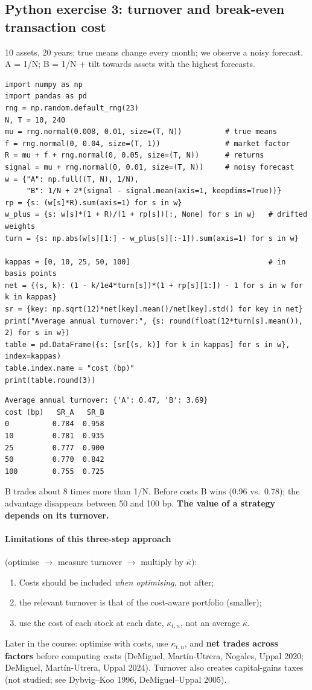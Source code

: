 \documentclass[11pt,a4paper]{report}
\begin{document}
\subsection*{Python exercise 3: turnover and break-even transaction cost}
10 assets, 20 years; true means change every month; we observe a noisy forecast.
A = 1/N; B = 1/N + tilt towards assets with the highest forecasts.
\begin{lstlisting}
import numpy as np
import pandas as pd
rng = np.random.default_rng(23)
N, T = 10, 240
mu = rng.normal(0.008, 0.01, size=(T, N))          # true means
f = rng.normal(0, 0.04, size=(T, 1))               # market factor
R = mu + f + rng.normal(0, 0.05, size=(T, N))      # returns
signal = mu + rng.normal(0, 0.01, size=(T, N))     # noisy forecast
w = {"A": np.full((T, N), 1/N),
     "B": 1/N + 2*(signal - signal.mean(axis=1, keepdims=True))}
rp = {s: (w[s]*R).sum(axis=1) for s in w}
w_plus = {s: w[s]*(1 + R)/(1 + rp[s])[:, None] for s in w}   # drifted weights
turn = {s: np.abs(w[s][1:] - w_plus[s][:-1]).sum(axis=1) for s in w}

kappas = [0, 10, 25, 50, 100]                                # in basis points
net = {(s, k): (1 - k/1e4*turn[s])*(1 + rp[s][1:]) - 1 for s in w for k in kappas}
sr = {key: np.sqrt(12)*net[key].mean()/net[key].std() for key in net}
print("Average annual turnover:", {s: round(float(12*turn[s].mean()), 2) for s in w})
table = pd.DataFrame({s: [sr[(s, k)] for k in kappas] for s in w}, index=kappas)
table.index.name = "cost (bp)"
print(table.round(3))
\end{lstlisting}
\begin{lstlisting}[style=out]
Average annual turnover: {'A': 0.47, 'B': 3.69}
cost (bp)   SR_A   SR_B
0          0.784  0.958
10         0.781  0.935
25         0.777  0.900
50         0.770  0.842
100        0.755  0.725
\end{lstlisting}
B trades about 8 times more than 1/N. Before costs B wins (0.96 vs.\ 0.78);
the advantage disappears between 50 and 100 bp. \textbf{The value of a strategy
depends on its turnover.}

\paragraph{Limitations of this three-step approach} (optimise $\to$ measure
turnover $\to$ multiply by $\bar\kappa$):
\begin{enumerate}
  \item Costs should be included \emph{when optimising}, not after;
  \item the relevant turnover is that of the cost-aware portfolio (smaller);
  \item use the cost of each stock at each date, $\kappa_{t,n}$, not an average $\bar\kappa$.
\end{enumerate}
Later in the course: optimise with costs, use $\kappa_{t,n}$, and \textbf{net
trades across factors} before computing costs (DeMiguel, Mart\'in-Utrera,
Nogales, Uppal 2020; DeMiguel, Mart\'in-Utrera, Uppal 2024). Turnover also
creates capital-gains taxes (not studied; see Dybvig--Koo 1996, DeMiguel--Uppal 2005).
\end{document}
